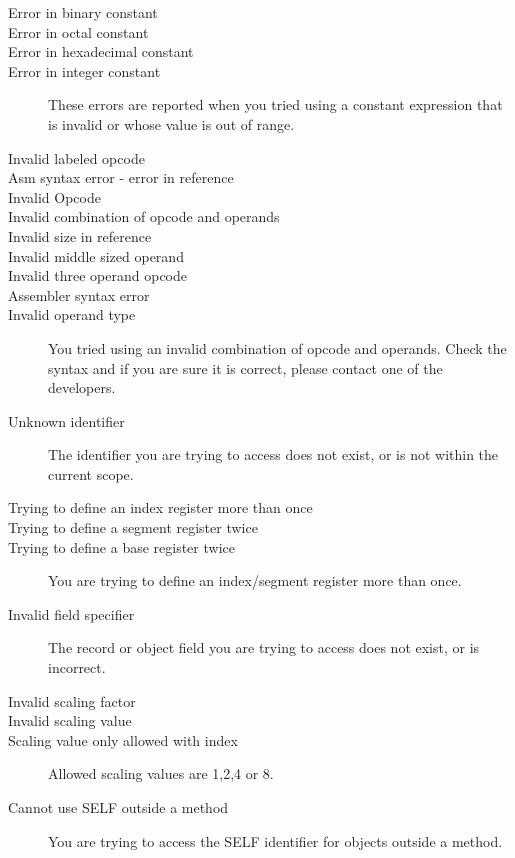 \begin{description}
\item [Error in binary constant]
\item [Error in octal constant]
\item [Error in hexadecimal constant]
\item [Error in integer constant]
\label{ErrorConst}
These errors are reported when you tried using a constant
expression that is invalid or whose value is out of range.

\item [Invalid labeled opcode]
\item [Asm syntax error - error in reference]
\item [Invalid Opcode]
\item [Invalid combination of opcode and operands]
\item [Invalid size in reference]
\item [Invalid middle sized operand]
\item [Invalid three operand opcode]
\item [Assembler syntax error]
\item [Invalid operand type]
You tried using an invalid combination of opcode and operands. Check the syntax
and if you are sure it is correct, please contact one of the developers.

\item [Unknown identifier]
The identifier you are trying to access does not exist, or is not within the
current scope.

\item [Trying to define an index register more than once]
\item [Trying to define a segment register twice]
\item [Trying to define a base register twice]
You are trying to define an index/segment register more than once.

\item [Invalid field specifier]
The record or object field you are trying to access does not exist, or
is incorrect.

\item [Invalid scaling factor]
\item [Invalid scaling value]
\item [Scaling value only allowed with index]
Allowed scaling values are 1,2,4 or 8.


\item [Cannot use SELF outside a method]
You are trying to access the SELF identifier for objects outside a method.



\end{description}
